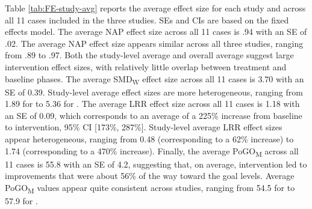 \documentclass[
]{book}
\begin{document}
Table \ref{tab:FE-study-avg} reports the average effect size for each study and across all 11 cases included in the three studies. SEs and CIs are based on the fixed effects model. The average NAP effect size across all 11 cases is .94 with an SE of .02. The average NAP effect size appears similar across all three studies, ranging from .89 to .97. Both the study-level average and overall average suggest large intervention effect sizes, with relatively little overlap between treatment and baseline phases. The average SMD\textsubscript{W} effect size across all 11 cases is 3.70 with an SE of 0.39. Study-level average effect sizes are more heterogeneous, ranging from 1.89 for \citet{Casey1978} to 5.36 for \citet{StrasbergerFerreri2014}. The average LRR effect size across all 11 cases is 1.18 with an SE of 0.09, which corresponds to an average of a 225\% increase from baseline to intervention, 95\% CI {[}173\%, 287\%{]}. Study-level average LRR effect sizes appear heterogeneous, ranging from 0.48 (corresponding to a 62\% increase) to 1.74 (corresponding to a 470\% increase). Finally, the average PoGO\textsubscript{M} across all 11 cases is 55.8 with an SE of 4.2, suggesting that, on average, intervention led to improvements that were about 56\% of the way toward the goal levels. Average PoGO\textsubscript{M} values appear quite consistent across studies, ranging from 54.5 for \citet{Casey1978} to 57.9 for \citet{Byiers2014}.

\begin{table}

\caption{\label{tab:FE-study-avg}Study-Level Average and Overall Average Effect Sizes Across Studies Based on Fixed Effects Models with Equal Weights}
\centering
{}
\end{table}
\end{document}
